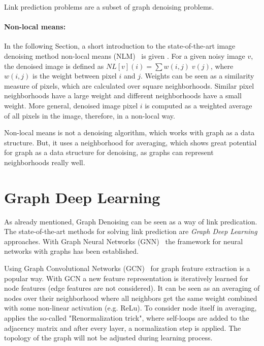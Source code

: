 \begin{tcolorbox}[colback=red!5!white,colframe=red!75!black]
    Link prediction problems are a subset of graph denoising problems.
\end{tcolorbox}

\paragraph{Non-local means:}
In the following Section, a short introduction to the 
state-of-the-art image denoising method non-local means (NLM)~\cite{noneLocalMean} is given .
For a given noisy image $v$, the denoised image is defined as $NL[v](i) = \sum{w(i,j) \; v(j)}$,
where $w(i,j)$ is the weight between pixel $i$ and $j$. 
Weights can be seen as a similarity measure of pixels, which are calculated over square neighborhoods.
Similar pixel neighborhoods have a large weight and different neighborhoods have a small weight.
More general, denoised image pixel $i$ is computed as a weighted average of all pixels in the 
image, therefore, in a non-local way.

Non-local means is not a denoising algorithm, which works with graph as a data structure.
But, it uses a neighborhood for averaging, which shows great potential for graph
as a data structure for denoising, as graphs can represent neighborhoods really well.


\section{Graph Deep Learning}
\label{sec:graph_depp_learning}
As already mentioned, Graph Denoising can be seen as a way of link predication. 
The state-of-the-art methods for solving link prediction are \textit{Graph Deep Learning} approaches.
With Graph Neural Networks (GNN)~\cite{GNN} the framework
for neural networks with graphs has been established. 

Using Graph Convolutional Networks (GCN)~\cite{GCN} for graph feature extraction is a popular way. 
With GCN a new feature representation is iteratively learned for node features (edge features are not considered).
It can be seen as an averaging of nodes over their neighborhood where all neighbors get the same weight combined with some non-linear activation (e.g. ReLu). 
To consider node itself in averaging, \citet{GCN} applies the so-called "Renormalization trick", where self-loops are added to the 
adjacency matrix and after every layer, a normalization step is applied. 
The topology of the graph will not be adjusted during learning process.

